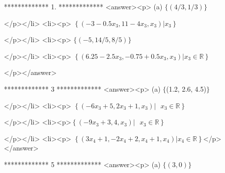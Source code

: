 *************
1.
*************
<answer><p> (a) \(\{(4/3, 1/3)\}\)

</p></li>
<li><p> \(\left\{\left(-3 - 0.5x_3, 11 - 4x_3, x_3 \right) | x_3\right\}\)

</p></li>
<li><p> \(\{(-5, 14/5, 8/5)\}\)

</p></li>
<li><p> \(\left\{\left(6.25 - 2.5x_3, -0.75 + 0.5x_3 , x_3\right) | x_3 \in  \mathbb{R}\right\}\)

</p></answer>


*************
3
*************
<answer><p> (a)  $\{$(1.2, 2.6, 4.5)$\}$

</p></li>
<li><p> \(\left\{\left(-6 x_3+ 5, 2 x_3 + 1, x_3 \right) |\text{  }x_3 \in  \mathbb{R}\right\}\)

</p></li>
<li><p>\(\left\{\left(-9 x_3 + 3, 4, x_3 \right) |\text{  }x_3 \in  \mathbb{R}\right\}\)

</p></li>
<li><p> \(\left\{\left(3 x_4 + 1, -2x_4 + 2, x_4 + 1, x_4\right) | x_4 \in  \mathbb{R}\right\}\)</p></answer>


*************
5
*************
<answer><p> (a)  \(\{(3,0)\}\)


